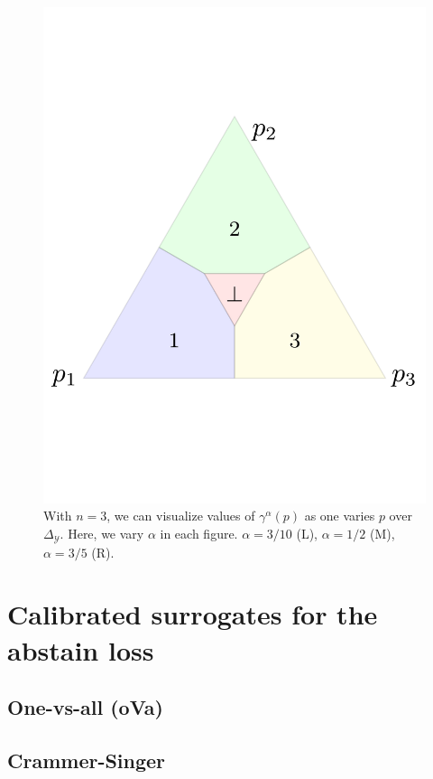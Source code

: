 \documentclass[anon,12pt]{colt2021} %
\newcommand{\simplex}{\Delta_\Y}
\newcommand{\Y}{\mathcal{Y}}
\begin{document}
\begin{figure}
\begin{minipage}{.32\textwidth}
	\includegraphics[width=\linewidth]{figs/abstain-alpha-point6.pdf}
\end{minipage}%
\caption{With $n = 3$, we can visualize values of $\gamma^\alpha(p)$ as one varies $p$ over $\simplex$.   Here, we vary $\alpha$ in each figure. $\alpha = 3/10$ (L), $\alpha = 1/2$ (M), $\alpha = 3/5$ (R).}
\end{figure}

\section{Calibrated surrogates for the abstain loss}

\subsection{One-vs-all (oVa)}

\subsection{Crammer-Singer}
\end{document}
